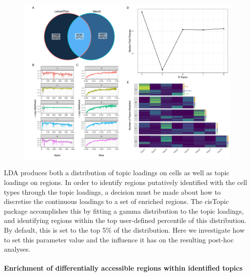 \begin{figure}
  \centering
  \includegraphics[width=\textwidth]{plot/ch4/sc_macs2.pdf}
  \label{fig:sc_macs2}
\end{figure}

LDA produces both a distribution of topic loadings on cells as well as topic loadings on regions. In order to identify regions putatively identified with the cell types through the topic loadings, a decision must be made about how to discretise the continuous loadings to a set of enriched regions. The cisTopic package accomplishes this by fitting a gamma distribution to the topic loadings, and identifying regions within the top user-defined percentile of this distribution. By default, this is set to the top 5\% of the distribution. Here we investigate how to set this parameter value and the influence it has on the resulting post-hoc analyses. 



\paragraph{Enrichment of differentially accessible regions within identified topics}

